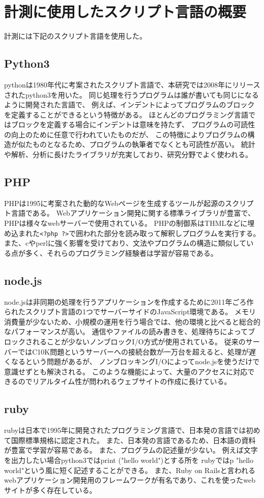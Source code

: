 \chapter{計測に使用したスクリプト言語の概要}
\label{cha:script-language}
計測には下記のスクリプト言語を使用した。
\section{Python3}
pythonは1980年代に考案されたスクリプト言語で、本研究では2008年にリリースされたpython3を用いた。
同じ処理を行うプログラムは誰が書いても同じになるように開発された言語で、
例えば、インデントによってプログラムのブロックを定義することができるという特徴がある。
ほとんどのプログラミング言語ではブロックを定義する場合にインデントは意味を持たず、
プログラムの可読性の向上のために任意で行われていたものだが、
この特徴によりプログラムの構造が似たものとなるため、プログラムの執筆者でなくとも可読性が高い。
統計や解析、分析に長けたライブラリが充実しており、研究分野でよく使われる。

\section{PHP}
PHPは1995に考案された動的なWebページを生成するツールが起源のスクリプト言語である。
Webアプリケーション開発に関する標準ライブラリが豊富で、PHPは様々なwebサーバーで使用されている。
PHPの制御系はTHMLなどに埋め込まれた\verb|<?php ?>|で囲われた部分を読み取って解釈しプログラムを実行する。
また、cやperlに強く影響を受けており、文法やプログラムの構造に類似している点が多く、それらのプログラミング経験者は学習が容易である。

\section{node.js}
node.jsは非同期の処理を行うアプリケーションを作成するために2011年ごろ作られたスクリプト言語の1つでサーバーサイドのJavaScript環境である。
メモリ消費量が少ないため、小規模の運用を行う場合では、他の環境と比べると総合的なパフォーマンスが高い。
通信やファイルの読み書きを、処理待ちによってブロックされることが少ないノンブロックI/O方式が使用されている。
従来のサーバーではC10K問題というサーバーへの接続台数が一万台を超えると、処理が遅くなるという問題があるが、
ノンブロッキングI/Oによってnode.jsを使うだけで意識せずとも解決される。
このような機能によって、大量のアクセスに対応できるのでリアルタイム性が問われるウェブサイトの作成に長けている。

\section{ruby}
rubyは日本で1995年に開発されたプログラミング言語で、日本発の言語では初めて国際標準規格に認定された。
また、日本発の言語であるため、日本語の資料が豊富で学習が容易である。
また、プログラムの記述量が少ない。
例えば文字を出力したい場合python3ではprint ("hello world")とする所を
rubyではp "hello world"という風に短く記述することができる。
また、Ruby on Railsと言われるwebアプリケーション開発用のフレームワークが有名であり、これを使ったwebサイトが多く存在している。